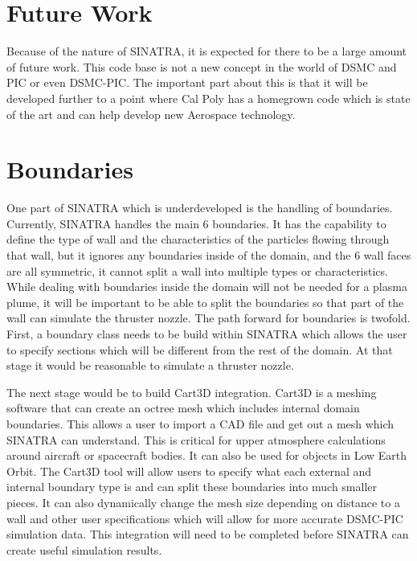 \section{Future Work}

Because of the nature of SINATRA, it is expected for there to be a large amount of future work. This code base is not a new concept in the world of DSMC and PIC or even DSMC-PIC. The important part about this is that it will be developed further to a point where Cal Poly has a homegrown code which is state of the art and can help develop new Aerospace technology.

\section{Boundaries}

One part of SINATRA which is underdeveloped is the handling of boundaries. Currently, SINATRA handles the main 6 boundaries. It has the capability to define the type of wall and the characteristics of the particles flowing through that wall, but it ignores any boundaries inside of the domain, and the 6 wall faces are all symmetric, it cannot split a wall into multiple types or characteristics. While dealing with boundaries inside the domain will not be needed for a plasma plume, it will be important to be able to split the boundaries so that part of the wall can simulate the thruster nozzle. The path forward for boundaries is twofold. First, a boundary class needs to be build within SINATRA which allows the user to specify sections which will be different from the rest of the domain. At that stage it would be reasonable to simulate a thruster nozzle. \par

\indent The next stage would be to build Cart3D integration. Cart3D is a meshing software that can create an octree mesh which includes internal domain boundaries. This allows a user to import a CAD file and get out a mesh which SINATRA can understand. This is critical for upper atmosphere calculations around aircraft or spacecraft bodies. It can also be used for objects in Low Earth Orbit. The Cart3D tool will allow users to specify what each external and internal boundary type is and can split these boundaries into much smaller pieces. It can also dynamically change the mesh size depending on distance to a wall and other user specifications which will allow for more accurate DSMC-PIC simulation data. This integration will need to be completed before SINATRA can create useful simulation results. \par


